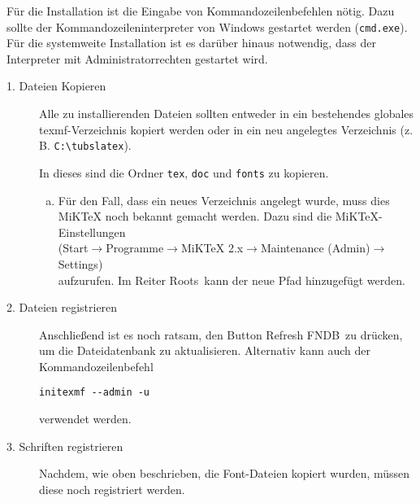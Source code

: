 Für die Installation ist die Eingabe von Kommandozeilenbefehlen nötig.
Dazu sollte der Kommandozeileninterpreter von Windows gestartet
werden (\lstinline{cmd.exe}). Für die systemweite Installation ist es
darüber hinaus notwendig, dass der Interpreter mit
Administratorrechten gestartet wird. %

\begin{description}
  \item[1. Dateien Kopieren]
  
    Alle zu installierenden Dateien sollten entweder in ein bestehendes globales
    texmf-Verzeichnis kopiert werden oder in ein neu angelegtes Verzeichnis
    (z.\,B. \lstinline{C:\tubslatex}).
    
    In dieses sind die Ordner \lstinline{tex}, \lstinline{doc} und 
    \lstinline{fonts} zu kopieren.
    
    \begin{enumerate}[a)]
      \item {\bfseries }
        
        Für den Fall, dass ein neues Verzeichnis angelegt wurde,
        muss dies MiKTeX noch bekannt gemacht werden.
        Dazu sind die MiKTeX-Einstellungen\\
        {\sffamily(Start$\to$Programme$\to$MiKTeX 2.x$\to$Maintenance (Admin)$\to$Settings)\\
        }
        aufzurufen.
        Im Reiter \glqq Roots\grqq\ kann der neue Pfad hinzugefügt werden.
    \end{enumerate}

  \item[2. Dateien registrieren]

    Anschließend ist es noch ratsam, den Button \glqq Refresh FNDB\grqq\
    zu drücken, um die Dateidatenbank zu aktualisieren. Alternativ kann auch 
    der Kommandozeilenbefehl
    \begin{lstlisting}[style=cmd]
initexmf --admin -u
    \end{lstlisting}
     verwendet werden.

  \item[3. Schriften registrieren]
    Nachdem, wie oben beschrieben, die Font-Dateien kopiert wurden, müssen
    diese noch registriert werden.

    \begin{enumerate}


\end{enumerate}
\end{description}
